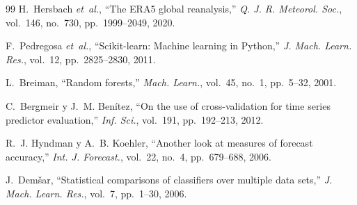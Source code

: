 \documentclass[conference,a4paper]{IEEEtran}
\begin{document}
\begin{thebibliography}{99}
H.~Hersbach \emph{et~al.}, ``The ERA5 global reanalysis,'' \emph{Q. J. R. Meteorol. Soc.}, vol.~146, no.~730, pp.~1999--2049, 2020.

F.~Pedregosa \emph{et~al.}, ``Scikit-learn: Machine learning in Python,'' \emph{J. Mach. Learn. Res.}, vol.~12, pp.~2825--2830, 2011.

L.~Breiman, ``Random forests,'' \emph{Mach. Learn.}, vol.~45, no.~1, pp.~5--32, 2001.

C.~Bergmeir y J.~M. Benítez, ``On the use of cross-validation for time series predictor evaluation,'' \emph{Inf. Sci.}, vol.~191, pp.~192--213, 2012.

R.~J. Hyndman y A.~B. Koehler, ``Another look at measures of forecast accuracy,'' \emph{Int. J. Forecast.}, vol.~22, no.~4, pp.~679--688, 2006.

J.~Dem\v{s}ar, ``Statistical comparisons of classifiers over multiple data sets,'' \emph{J. Mach. Learn. Res.}, vol.~7, pp.~1--30, 2006.

\end{thebibliography}
\end{document}
